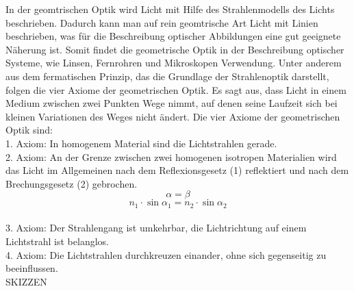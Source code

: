 In der geomtrischen Optik wird Licht mit Hilfe des Strahlenmodells des Lichts beschrieben. Dadurch kann man auf rein geomtrische Art Licht mit Linien beschrieben, was für die Beschreibung optischer Abbildungen eine gut geeignete Näherung ist. Somit findet die geometrische Optik in der Beschreibung optischer Systeme, wie Linsen, Fernrohren und Mikroskopen Verwendung. Unter anderem aus dem fermatischen Prinzip, das die Grundlage der Strahlenoptik darstellt, folgen die vier Axiome der geometrischen Optik. Es sagt aus, dass Licht in einem Medium zwischen zwei Punkten Wege nimmt, auf denen seine Laufzeit sich bei kleinen Variationen des Weges nicht ändert. Die vier Axiome der geometrischen Optik sind: \\
    1. Axiom: In homogenem Material sind die Lichtstrahlen gerade. \\
    2. Axiom: An der Grenze zwischen zwei homogenen isotropen Materialien wird das Licht im Allgemeinen nach dem Reflexionsgesetz (1) reflektiert und nach dem Brechungsgesetz (2) gebrochen. 
    \begin{equation}
        \alpha = \beta
    \end{equation}
    \begin{equation}
        n_1 \cdot \sin{\alpha_1} = n_2 \cdot \sin{\alpha_2}
    \end{equation}
    \\
    3. Axiom: Der Strahlengang ist umkehrbar, die Lichtrichtung auf einem Lichtstrahl ist belanglos. \\
    4. Axiom: Die Lichtstrahlen durchkreuzen einander, ohne sich gegenseitig zu beeinflussen. \\
    
    SKIZZEN